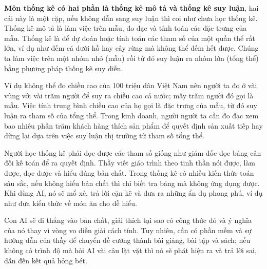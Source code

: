\documentclass[a4paper,12pt]{article}
\theoremstyle{remark}
\begin{document}
{\vspace{0.2cm}

\noindent\textcolor{dialoguecolor}{\textbf{Môn thống kê có hai phần là thống kê mô tả và thống kê suy luận}, hai cái này là một cặp, nếu không dẫn sang suy luận thì coi như chưa học thống kê. Thống kê mô tả là làm việc trên mẫu, đo đạc và tính toán các đặc trưng của mẫu. Thống kê là để dự đoán hoặc tính toán các tham số của một quần thể rất lớn, ví dụ như đếm cá dưới hồ hay cây rừng mà không thể đếm hết được. Chúng ta làm việc trên một nhóm nhỏ (mẫu) rồi từ đó suy luận ra nhóm lớn (tổng thể) bằng phương pháp thống kê suy diễn.}

\vspace{0.2cm}

\noindent\textcolor{dialoguecolor}{Ví dụ không thể đo chiều cao của 100 triệu dân Việt Nam nên người ta đo ở vài vùng với vài trăm người để suy ra chiều cao cả nước; mấy trăm người đó gọi là mẫu. Việc tính trung bình chiều cao của họ gọi là đặc trưng của mẫu, từ đó suy luận ra tham số của tổng thể. Trong kinh doanh, người người ta cần đo đạc xem bao nhiêu phần trăm khách hàng thích sản phẩm để quyết định sản xuất tiếp hay dừng lại dựa trên việc suy luận thị trường từ tham số tổng thể.}

\vspace{0.2cm}

\noindent\textcolor{dialoguecolor}{Người học thống kê phải đọc được các tham số giống như giám đốc đọc bảng cân đối kế toán để ra quyết định. Thầy viết giáo trình theo tinh thần nói được, làm được, đọc được và hiểu đúng bản chất. Trong thống kê có nhiều kiến thức toán sâu sắc, nếu không hiểu bản chất thì chỉ biết tra bảng mà không ứng dụng được. Khi dùng AI, nó sẽ mổ xẻ, trả lời cặn kẽ và đưa ra những ẩn dụ phong phú, ví dụ như đưa kiến thức về món ăn cho dễ hiểu.}

\vspace{0.2cm}

\noindent\textcolor{dialoguecolor}{Con AI sẽ đi thẳng vào bản chất, giải thích tại sao có công thức đó và ý nghĩa của nó thay vì vòng vo diễn giải cách tính. Tuy nhiên, cần có phần mềm và sự hướng dẫn của thầy để chuyển đề cương thành bài giảng, bài tập và sách; nếu không có trình độ mà hỏi AI vài câu lặt vặt thì nó sẽ phát hiện ra và trả lời sai, dẫn đến kết quả hỏng bét.}
}

\vspace{1cm}

\end{document}
